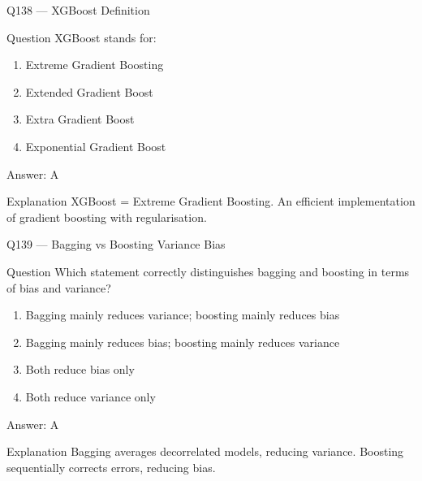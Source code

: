 \documentclass[aspectratio=169,8pt]{beamer}
\begin{document}
	\begin{frame}{Q138 --- XGBoost Definition}
		\begin{block}{Question}
			XGBoost stands for:
			\begin{enumerate}
				\item Extreme Gradient Boosting
				\item Extended Gradient Boost
				\item Extra Gradient Boost
				\item Exponential Gradient Boost
			\end{enumerate}
		\end{block}
		\begin{exampleblock}{Answer: A}\end{exampleblock}
		\begin{block}{Explanation}
			XGBoost = Extreme Gradient Boosting. An efficient implementation of gradient boosting with regularisation.
		\end{block}
	\end{frame}
	
	\begin{frame}{Q139 --- Bagging vs Boosting Variance Bias}
		\begin{block}{Question}
			Which statement correctly distinguishes bagging and boosting in terms of bias and variance?
			\begin{enumerate}
				\item Bagging mainly reduces variance; boosting mainly reduces bias
				\item Bagging mainly reduces bias; boosting mainly reduces variance
				\item Both reduce bias only
				\item Both reduce variance only
			\end{enumerate}
		\end{block}
		\begin{exampleblock}{Answer: A}\end{exampleblock}
		\begin{block}{Explanation}
			Bagging averages decorrelated models, reducing variance. Boosting sequentially corrects errors, reducing bias.
		\end{block}
	\end{frame}
	
\end{document}
